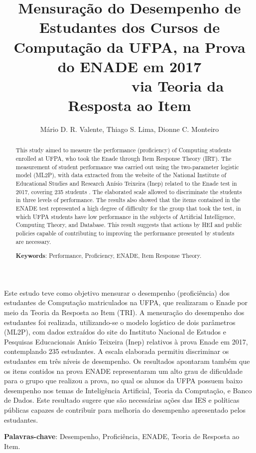 \documentclass[12pt]{article}
\title{Mensuração do Desempenho de Estudantes dos Cursos de Computação da UFPA, na Prova do ENADE em 2017 \ \ \ \ \ \ \ \ \ \ \ \ via Teoria da Resposta ao Item}
\author{Mário D. R. Valente\inst{1}, Thiago S. Lima\inst{1}, Dionne C. Monteiro\inst{2} }
\begin{document}
 

\maketitle

\begin{abstract}
 This study aimed to measure the performance (proficiency) of Computing students enrolled at UFPA, who took the Enade through Item Response Theory (IRT). The measurement of student performance was carried out using the two-parameter logistic model (ML2P), with data extracted from the website of the National Institute of Educational Studies and Research Anísio Teixeira (Inep) related to the Enade test in 2017, covering 235 students . The elaborated scale allowed to discriminate the students in three levels of performance. The results also showed that the items contained in the ENADE test represented a high degree of difficulty for the group that took the test, in which UFPA students have low performance in the subjects of Artificial Intelligence, Computing Theory, and Database. This result suggests that actions by HEI and public policies capable of contributing to improving the performance presented by students are necessary.
  
\noindent
  \textbf{Keywords}: Performance, Proficiency, ENADE, Item Response Theory.
\end{abstract}

\begin{resumo} 
Este estudo teve como objetivo mensurar o desempenho (proficiência) dos estudantes de Computação matriculados na UFPA, que realizaram o Enade por meio da Teoria da Resposta ao Item (TRI). A mensuração do desempenho dos estudantes foi realizada, utilizando-se o modelo logístico de dois parâmetros (ML2P), com dados extraídos do site do Instituto Nacional de Estudos e Pesquisas Educacionais Anísio Teixeira (Inep) relativos à prova Enade em 2017, contemplando 235 estudantes. A escala elaborada permitiu discriminar os estudantes em três níveis de desempenho. Os resultados apontaram também que os itens contidos na prova ENADE representaram um alto grau de dificuldade para o grupo que realizou a prova, no qual os alunos da UFPA possuem baixo desempenho nos temas de Inteligência Artificial, Teoria da Computação, e Banco de Dados. Este resultado sugere que são necessárias ações das IES e políticas públicas capazes de contribuir para melhoria do desempenho apresentado pelos estudantes.
  
\noindent
  \textbf{Palavras-chave}: Desempenho, Proficiência, ENADE, Teoria de Resposta ao Item.
\end{resumo}
\end{document}
